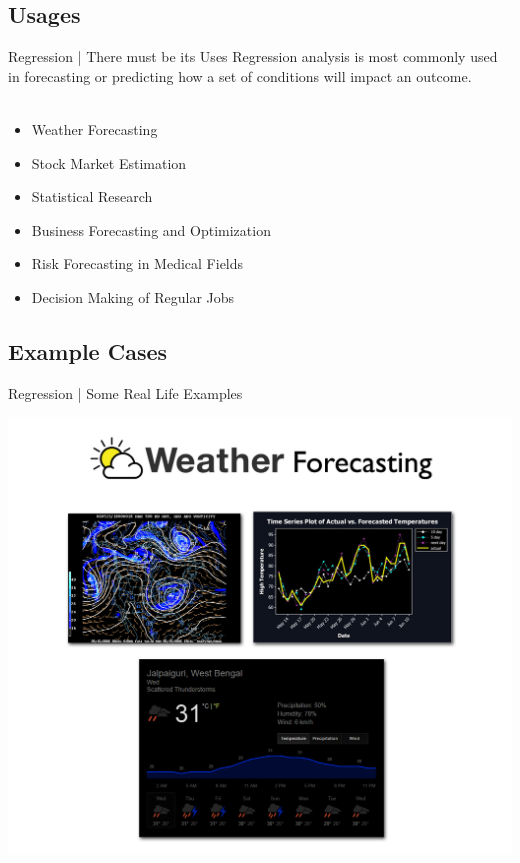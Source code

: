 \documentclass[10pt]{beamer}
\begin{document}
	\subsection{Usages}
	\begin{frame}{Regression | There must be its Uses }
		\Large{Regression analysis}\large{ is most commonly used in}\Large{ forecasting or predicting}\large{ how a set of conditions will impact an outcome.\\~\\}
		\normalsize{\begin{itemize}
				\item<1> Weather Forecasting
				\item<2> Stock Market Estimation
				\item<3> Statistical Research 
				\item<4> Business Forecasting and Optimization
				\item<5> Risk Forecasting in Medical Fields
				\item<6> Decision Making of Regular Jobs 
			\end{itemize}
		}
	\end{frame}
	
	\subsection{Example Cases}
	\begin{frame}{Regression | Some Real Life Examples}
		\begin{center}
			\vspace{-5mm}
			\includegraphics[scale=0.2]{images/wea}
		\end{center}
	\end{frame}
	
\end{document}

